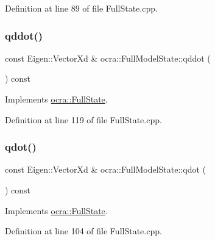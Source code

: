 Definition at line 89 of file Full\+State.\+cpp.

\hypertarget{classocra_1_1FullModelState_a2578e15742268c14fb4ce5f26033256e}{}\label{classocra_1_1FullModelState_a2578e15742268c14fb4ce5f26033256e} 
\subsubsection{\texorpdfstring{qddot()}{qddot()}}
{\footnotesize\ttfamily const Eigen\+::\+Vector\+Xd \& ocra\+::\+Full\+Model\+State\+::qddot (\begin{DoxyParamCaption}{ }\end{DoxyParamCaption}) const\hspace{0.3cm}{\ttfamily [virtual]}}



Implements \hyperlink{classocra_1_1FullState_a5882a53273cd9d3baae36b5850deadae}{ocra\+::\+Full\+State}.



Definition at line 119 of file Full\+State.\+cpp.

\hypertarget{classocra_1_1FullModelState_a034c567bae39a29f391f6462f52b0834}{}\label{classocra_1_1FullModelState_a034c567bae39a29f391f6462f52b0834} 
\subsubsection{\texorpdfstring{qdot()}{qdot()}}
{\footnotesize\ttfamily const Eigen\+::\+Vector\+Xd \& ocra\+::\+Full\+Model\+State\+::qdot (\begin{DoxyParamCaption}{ }\end{DoxyParamCaption}) const\hspace{0.3cm}{\ttfamily [virtual]}}



Implements \hyperlink{classocra_1_1FullState_a7018fe03dc3c8b3ec95d3c2015ae60e6}{ocra\+::\+Full\+State}.



Definition at line 104 of file Full\+State.\+cpp.

\hypertarget{classocra_1_1FullModelState_aa774cf6a9a50ed4b50c037ae981d2c7b}{}\label{classocra_1_1FullModelState_aa774cf6a9a50ed4b50c037ae981d2c7b} 
